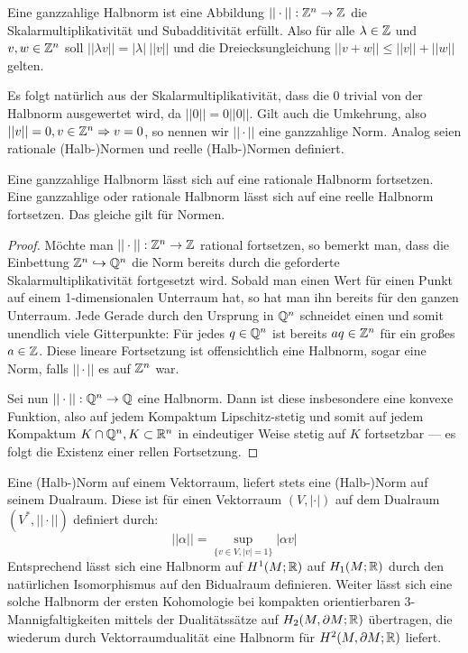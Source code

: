     \begin{defn}
    	Eine ganzzahlige Halbnorm ist eine Abbildung $||\cdot||: \mathbb{Z}^n \to \mathbb{Z}$  die Skalarmultiplikativität und Subadditivität erfüllt. Also für alle $\lambda \in \mathbb{Z}$ und $v,w\in \mathbb{Z}^n$ soll $||\lambda v||=\vert\lambda\vert~||v||$ und die Dreiecksungleichung $||v+w||\le ||v||+||w||$ gelten.
    \end{defn}
    Es folgt natürlich aus der Skalarmultiplikativität, dass die $0$ trivial von der Halbnorm ausgewertet wird, da $||0|| = 0||0||$. Gilt auch die Umkehrung, also $||v||=0, v\in \mathbb{Z}^n \Rightarrow v=0$, so nennen wir $||\cdot ||$ eine ganzzahlige Norm. Analog seien rationale (Halb-)Normen und reelle (Halb-)Normen definiert. 
    \begin{lem}
    \label{lem:fortsetzungnorm}
    	Eine ganzzahlige Halbnorm lässt sich auf eine rationale Halbnorm fortsetzen. Eine ganzzahlige oder rationale Halbnorm lässt sich auf eine reelle Halbnorm fortsetzen. Das gleiche gilt für Normen.
    \end{lem}
    \begin{proof}
    	Möchte man $||\cdot||:  \mathbb{Z}^n \to \mathbb{Z}$ rational fortsetzen, so bemerkt man, dass die Einbettung $\mathbb{Z}^n \hookrightarrow \mathbb{Q}^n$ die Norm bereits durch die geforderte Skalarmultiplikativität fortgesetzt wird. Sobald man einen Wert für einen Punkt auf einem 1-dimensionalen Unterraum hat, so hat man ihn bereits für den ganzen Unterraum. Jede Gerade durch den Ursprung in $\mathbb{Q}^n$ schneidet einen und somit unendlich viele Gitterpunkte: Für jedes $q \in \mathbb{Q}^n$ ist bereits $aq \in \mathbb{Z}^n$ für ein großes $a\in \mathbb{Z}$. Diese lineare Fortsetzung ist offensichtlich eine Halbnorm, sogar eine Norm, falls $||\cdot||$ es auf $\mathbb{Z}^n$ war.

    	Sei nun $||\cdot||: \mathbb{Q}^n \to \mathbb{Q}$ eine Halbnorm. Dann ist diese insbesondere eine konvexe Funktion, also auf jedem Kompaktum Lipschitz-stetig und somit auf jedem Kompaktum $K\cap \mathbb{Q}^n, K\subset \mathbb{R}^n$ in eindeutiger Weise stetig auf $K$ fortsetzbar --- es folgt die Existenz einer rellen Fortsetzung.
    \end{proof}



    \begin{bem}
        Eine (Halb-)Norm auf einem Vektorraum, liefert stets eine (Halb-)Norm auf seinem Dualraum. Diese ist für einen Vektorraum $(V,|\cdot|)$ auf dem Dualraum $(V^*,||\cdot||)$ definiert durch:
        \[
             ||\alpha||= \sup_{\{v\in V, |v|=1\}} |\alpha v|
         \] 
         Entsprechend lässt sich eine Halbnorm auf $H^1(M;\mathbb{R})$ auf $H_1(M;\mathbb{R})$ durch den natürlichen Isomorphismus auf den Bidualraum definieren. Weiter lässt sich eine solche Halbnorm der ersten Kohomologie bei kompakten orientierbaren 3-Mannigfaltigkeiten mittels der Dualitätssätze auf $H_2(M,\partial M;\mathbb{R})$ übertragen, die wiederum durch Vektorraumdualität eine Halbnorm für $H^2(M,\partial M;\mathbb{R})$ liefert.
    \end{bem}


